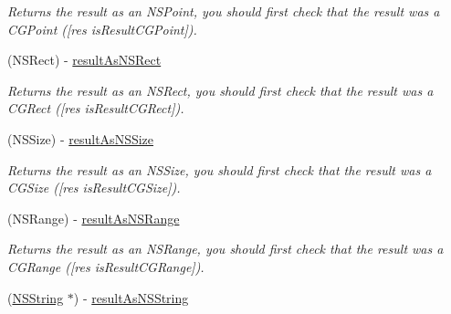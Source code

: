 \begin{DoxyCompactItemize}
\begin{DoxyCompactList}\small\item\em Returns the result as an NSPoint, you should first check that the result was a CGPoint (\mbox{[}res isResultCGPoint\mbox{]}). \item\end{DoxyCompactList}\item 
\hypertarget{interface_g_d_accessibility_operation_result_abf61581a94f9092d2101b29343ce63ff}{
(NSRect) -\/ \hyperlink{interface_g_d_accessibility_operation_result_abf61581a94f9092d2101b29343ce63ff}{resultAsNSRect}}
\label{interface_g_d_accessibility_operation_result_abf61581a94f9092d2101b29343ce63ff}

\begin{DoxyCompactList}\small\item\em Returns the result as an NSRect, you should first check that the result was a CGRect (\mbox{[}res isResultCGRect\mbox{]}). \item\end{DoxyCompactList}\item 
\hypertarget{interface_g_d_accessibility_operation_result_a9c532472181f102c06aa94e2886770a9}{
(NSSize) -\/ \hyperlink{interface_g_d_accessibility_operation_result_a9c532472181f102c06aa94e2886770a9}{resultAsNSSize}}
\label{interface_g_d_accessibility_operation_result_a9c532472181f102c06aa94e2886770a9}

\begin{DoxyCompactList}\small\item\em Returns the result as an NSSize, you should first check that the result was a CGSize (\mbox{[}res isResultCGSize\mbox{]}). \item\end{DoxyCompactList}\item 
\hypertarget{interface_g_d_accessibility_operation_result_ab9038dca21cd45c724c96116faf1e37e}{
(NSRange) -\/ \hyperlink{interface_g_d_accessibility_operation_result_ab9038dca21cd45c724c96116faf1e37e}{resultAsNSRange}}
\label{interface_g_d_accessibility_operation_result_ab9038dca21cd45c724c96116faf1e37e}

\begin{DoxyCompactList}\small\item\em Returns the result as an NSRange, you should first check that the result was a CGRange (\mbox{[}res isResultCGRange\mbox{]}). \item\end{DoxyCompactList}\item 
\hypertarget{interface_g_d_accessibility_operation_result_a8f872f6f46a21d122fec5efdb756a2a2}{
(\hyperlink{class_n_s_string}{NSString} $\ast$) -\/ \hyperlink{interface_g_d_accessibility_operation_result_a8f872f6f46a21d122fec5efdb756a2a2}{resultAsNSString}}
\label{interface_g_d_accessibility_operation_result_a8f872f6f46a21d122fec5efdb756a2a2}


\end{DoxyCompactItemize}
